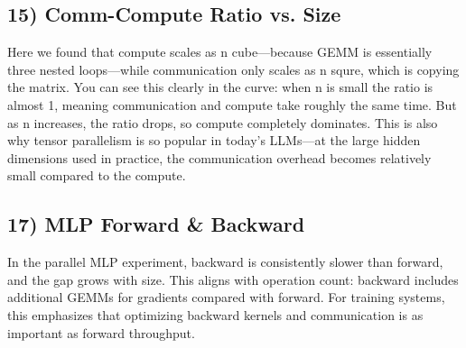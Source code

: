 \documentclass[11pt]{article}
\begin{document}
\subsection*{15) Comm-Compute Ratio vs. Size}
Here we found that compute scales as n cube---because GEMM is essentially three nested loops---while communication only scales as n squre, which is copying the matrix. You can see this clearly in the curve: when n is small the ratio is almost 1, meaning communication and compute take roughly the same time. But as n increases, the ratio drops, so compute completely dominates. This is also why tensor parallelism is so popular in today's LLMs---at the large hidden dimensions used in practice, the communication overhead becomes relatively small compared to the compute.


\subsection*{17) MLP Forward \& Backward}
In the parallel MLP experiment, backward is consistently slower than forward, and the gap grows with size. This aligns with operation count: backward includes additional GEMMs for gradients compared with forward. For training systems, this emphasizes that optimizing backward kernels and communication is as important as forward throughput.

\end{document}
